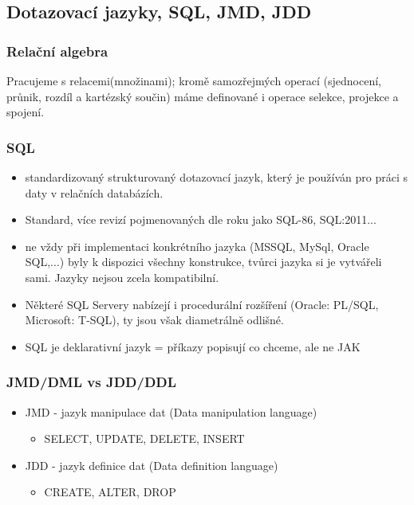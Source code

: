 \documentclass[10pt,a4paper]{article}
\begin{document}
\subsection{Dotazovací jazyky, SQL, JMD, JDD}
\subsubsection{Relační algebra}
Pracujeme s relacemi(množinami); kromě samozřejmých operací (sjednocení, průnik, rozdíl a kartézský součin) máme definované i operace selekce, projekce a spojení.

\subsubsection{SQL}
\begin{itemize}
\item standardizovaný strukturovaný dotazovací jazyk, který je používán pro práci s daty v relačních databázích. 
\item Standard, více revizí pojmenovaných dle roku jako SQL-86, SQL:2011...
\item ne vždy při implementaci konkrétního jazyka (MSSQL, MySql, Oracle SQL,...) byly k dispozici všechny konstrukce, tvůrci jazyka si je vytvářeli sami. Jazyky nejsou zcela kompatibilní.
\item Některé SQL Servery nabízejí i procedurální rozšíření (Oracle: PL/SQL, Microsoft: T-SQL), ty jsou však diametrálně odlišné.
\item SQL je deklarativní jazyk = příkazy popisují co chceme, ale ne JAK
\end{itemize}

\subsubsection{JMD/DML vs JDD/DDL}

\begin{itemize}
\item JMD - jazyk manipulace dat (Data manipulation language)
\begin{itemize}
\item SELECT, UPDATE, DELETE, INSERT
\end{itemize}
\item JDD - jazyk definice dat (Data definition language)
\begin{itemize} 
\item CREATE, ALTER, DROP
\end{itemize}
\end{itemize}
\end{document}
